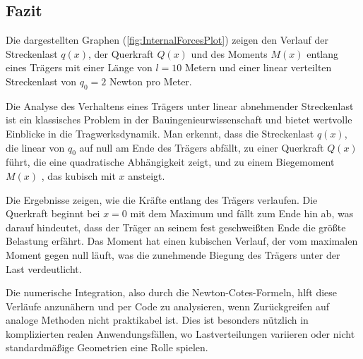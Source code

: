 \subsection{Fazit}
Die dargestellten Graphen (\ref{fig:InternalForcesPlot}) zeigen den Verlauf der Streckenlast $q(x)$, der Querkraft $Q(x)$ und des Moments $M(x)$ entlang eines Trägers mit einer Länge von $l = 10$ Metern und einer linear verteilten Streckenlast von $q_0 = 2$ Newton pro Meter. 

Die Analyse des Verhaltens eines Trägers unter linear abnehmender Streckenlast ist ein klassisches Problem in der Bauingenieurwissenschaft und bietet wertvolle Einblicke in die Tragwerksdynamik. Man erkennt, dass die Streckenlast $q(x)$, die linear von $q_0$ auf null am Ende des Trägers abfällt, zu einer Querkraft $Q(x)$ führt, die eine quadratische Abhängigkeit zeigt, und zu einem Biegemoment $M(x)$ , das kubisch mit $x$ ansteigt.

Die Ergebnisse zeigen, wie die Kräfte entlang des Trägers verlaufen. Die Querkraft beginnt bei $x=0$ mit dem Maximum und fällt zum Ende hin ab, was darauf hindeutet, dass der Träger an seinem fest geschweißten Ende die größte Belastung erfährt. Das Moment hat einen kubischen Verlauf, der vom maximalen Moment gegen null läuft, was die zunehmende Biegung des Trägers unter der Last verdeutlicht.

Die numerische Integration, also durch die Newton-Cotes-Formeln, hlft diese Verläufe anzunähern und per Code zu analysieren, wenn Zurückgreifen auf analoge Methoden nicht praktikabel ist. Dies ist besonders nützlich in komplizierten realen Anwendungsfällen, wo Lastverteilungen variieren oder nicht standardmäßige Geometrien eine Rolle spielen.